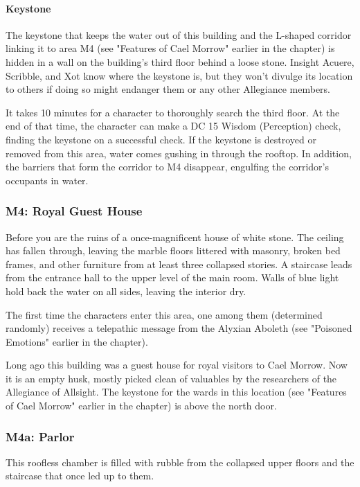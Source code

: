 \documentclass[10pt,a4paper,twoside,bg=print,twocolumn,openany,nodeprecatedcode]{dndbook}
\begin{document}
\paragraph{Keystone}
The keystone that keeps the water out of this building and the L-shaped corridor linking it to area M4 (see "Features of Cael Morrow" earlier in the chapter) is hidden in a wall on the building's third floor behind a loose stone. Insight Acuere, Scribble, and Xot know where the keystone is, but they won't divulge its location to others if doing so might endanger them or any other Allegiance members.

It takes 10 minutes for a character to thoroughly search the third floor. At the end of that time, the character can make a DC 15 Wisdom (Perception) check, finding the keystone on a successful check. If the keystone is destroyed or removed from this area, water comes gushing in through the rooftop. In addition, the barriers that form the corridor to M4 disappear, engulfing the corridor's occupants in water.

\subsubsection{M4: Royal Guest House}
\begin{DndReadAloud}{}
Before you are the ruins of a once-magnificent house of white stone. The ceiling has fallen through, leaving the marble floors littered with masonry, broken bed frames, and other furniture from at least three collapsed stories. A staircase leads from the entrance hall to the upper level of the main room. Walls of blue light hold back the water on all sides, leaving the interior dry.

\end{DndReadAloud}

The first time the characters enter this area, one among them (determined randomly) receives a telepathic message from the Alyxian Aboleth (see "Poisoned Emotions" earlier in the chapter).

Long ago this building was a guest house for royal visitors to Cael Morrow. Now it is an empty husk, mostly picked clean of valuables by the researchers of the Allegiance of Allsight. The keystone for the wards in this location (see "Features of Cael Morrow" earlier in the chapter) is above the north door.

\subsubsection{M4a: Parlor}
This roofless chamber is filled with rubble from the collapsed upper floors and the staircase that once led up to them.
\end{document}
